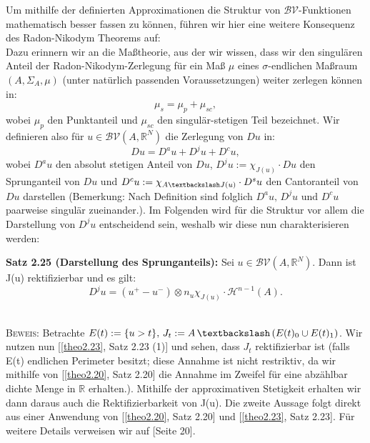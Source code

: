Um mithilfe der definierten Approximationen die Struktur von \(\mathcal{BV}\)-Funktionen mathematisch besser fassen zu können, führen wir hier eine weitere Konsequenz des Radon-Nikodym Theorems auf:\\
Dazu erinnern wir an die Maßtheorie, aus der wir wissen, dass wir den singulären Anteil der Radon-Nikodym-Zerlegung für ein Maß \(\mu\) eines \(\sigma\)-endlichen Maßraum \((A,\Sigma_A,\mu)\) (unter natürlich passenden Voraussetzungen) weiter zerlegen können in:
\begin{equation}
    \mu_s = \mu_p + \mu_{sc},
\end{equation}
wobei \(\mu_p\) den Punktanteil und \(\mu_{sc}\) den singulär-stetigen Teil bezeichnet. Wir definieren also für \(u \in \mathcal{BV}(A,\mathbb{R}^N)\) die Zerlegung von \(Du\) in:
\begin{equation}
    Du = D^a u + D^j u + D^c u,
\end{equation}
wobei \(D^a u\) den absolut stetigen Anteil von \(Du\), \(D^j u := \chi_{J(u)} \cdot Du\) den Sprunganteil von \(Du\) und \(D^c u := \chi_{A \textbackslash J(u)} \cdot D^s u\) den Cantoranteil von \(Du\) darstellen (Bemerkung: Nach Definition sind folglich \(D^a u, \, D^j u \text{ und }D^c u\) paarweise singulär zueinander.). Im Folgenden wird für die Struktur vor allem die Darstellung von \(D^j u\) entscheidend sein, weshalb wir diese nun charakterisieren werden:\\[0.5cm]
\colorbox{generalYellow}{\begin{minipage}{16cm}{\textcolor{black}{}{\label{theo2.25}}}
\textbf{Satz 2.25 (Darstellung des Sprunganteils):} Sei \(u \in \mathcal{BV}(A,\mathbb{R}^N)\). Dann ist J(u) rektifizierbar und es gilt:
\begin{equation}
    D^j u = (u^+ - u^-) \otimes n_u \chi_{J(u)} \cdot \mathcal{H}^{n-1}(A).
\end{equation} 
\end{minipage}}\\

\textsc{Beweis:} Betrachte \(E(t) := \{u > t\}, \, J_t := A \, \textbackslash \, (E(t)_0 \cup E(t)_1)\). Wir nutzen nun [\ref{theo2.23}, Satz 2.23 (1)] und sehen, dass \(J_t\) rektifizierbar ist (falls E(t) endlichen Perimeter besitzt; diese Annahme ist nicht restriktiv, da wir mithilfe von [\ref{theo2.20}, Satz 2.20] die Annahme im Zweifel für eine abzählbar dichte Menge in \(\mathbb{R}\) erhalten.). Mithilfe der approximativen Stetigkeit erhalten wir dann daraus auch die Rektifizierbarkeit von J(u). Die zweite Aussage folgt direkt aus einer Anwendung von [\ref{theo2.20}, Satz 2.20] und [\ref{theo2.23}, Satz 2.23]. Für weitere Details verweisen wir auf \cite{BraidesApprox}[Seite 20].\QEDB
